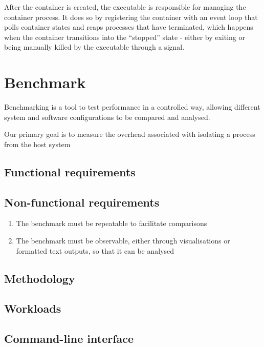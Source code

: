 After the container is created, the executable is responsible for 
managing the container process. It does so by registering the container with an event loop that
polls container states and reaps processes that have terminated, which happens when the container 
transitions into the \enquote{stopped} state - either by exiting or being manually killed by the executable through 
a signal. 
\section{Benchmark}
Benchmarking is a tool to test performance in a controlled way, allowing different 
system and software configurations to be compared and analysed.

Our primary goal is to measure the overhead associated with isolating a process from the host system 


\subsection{Functional requirements}

\subsection{Non-functional requirements}
\begin{enumerate}[i]
    \item The benchmark must be repeatable to facilitate comparisons
    \label{requirements:non-functional/benchmark/1}
    \item The benchmark must be observable, either through visualisations or formatted text outputs, 
    so that it can be analysed
    \label{requirements:non-functional/benchmark/2}
    \end{enumerate}
\subsection{Methodology}

\subsection{Workloads}

\subsection{Command-line interface}